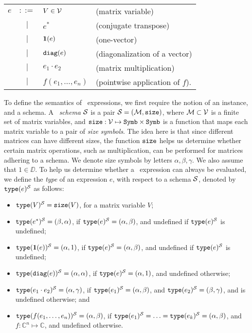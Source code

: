\medskip

\begin{tabular}{lcll}
$e$ & $::=$ & $V\in \mathcal{V}$ & (matrix variable)\\
 & $|$ & $e^*$ & (conjugate transpose)\\ 
 & $|$ & $\mathbf{1}(e)$ & (one-vector)\\ 
 & $|$ & $\texttt{diag}(e)$ & (diagonalization of a vector)\\  
 & $|$ & $e_1 \cdot e_2$ & (matrix multiplication)\\   
 & $|$ & $f(e_1,\ldots ,e_n)$ & (pointwise application of $f$).    
\end{tabular}

\medskip

To define the semantics of \lang\ expressions, we first require the notion of an instance, and a schema. A \lang\ {\em schema} $\mathcal{S}$ is a pair $\mathcal{S}=(\mathcal{M},\texttt{size})$, where $\mathcal{M}\subset \mathcal{V}$ is a finite set of matrix variables, and $\texttt{size}: \mathcal{V} \mapsto \texttt{Symb}\times \texttt{Symb}$ is a function that maps each matrix variable to a pair of {\em size symbols}. The idea here is that since different matrices can have different sizes, the function $\texttt{size}$ helps us determine whether certain matrix operations, such as multiplication, can be performed for matrices adhering to a schema. We denote size symbols by letters $\alpha,\beta,\gamma$. We also assume that $1\in \DD$. To help us determine whether a \lang\ expression can always be evaluated, we define the {\em type} of an expression $e$, with respect to a schema $\mathcal{S}$, denoted by $\texttt{type}(e)^{\mathcal{S}}$ as follows:
\begin{itemize}
\item $\texttt{type}(V)^{\mathcal{S}} = \texttt{size}(V)$, for a matrix variable $V$;
\item $\texttt{type}(e^*)^{\mathcal{S}} = (\beta,\alpha)$, if $\texttt{type}(e)^{\mathcal{S}}=(\alpha,\beta)$, and undefined if $\texttt{type}(e)^{\mathcal{S}}$ is undefined;
\item $\texttt{type}(\mathbf{1}(e))^{\mathcal{S}} = (\alpha,1)$, if $\texttt{type}(e)^{\mathcal{S}}=(\alpha,\beta)$, and undefined if $\texttt{type}(e)^{\mathcal{S}}$ is undefined;
\item $\texttt{type}(\texttt{diag}(e))^{\mathcal{S}} = (\alpha,\alpha)$, if $\texttt{type}(e)^{\mathcal{S}}=(\alpha,1)$, and undefined otherwise;
\item $\texttt{type}(e_1 \cdot e_2)^{\mathcal{S}} = (\alpha,\gamma)$, if $\texttt{type}(e_1)^{\mathcal{S}}=(\alpha,\beta)$, and $\texttt{type}(e_2)^{\mathcal{S}}=(\beta,\gamma)$, and is undefined otherwise; and
\item $\texttt{type}(f(e_1,\ldots ,e_n))^{\mathcal{S}} = (\alpha,\beta)$, if $\texttt{type}(e_1)^{\mathcal{S}} = \ldots = \texttt{type}(e_k)^{\mathcal{S}} = (\alpha,\beta)$, and $f:\mathbb{C}^n \mapsto  \mathbb{C}$, and undefined otherwise.
\end{itemize}

